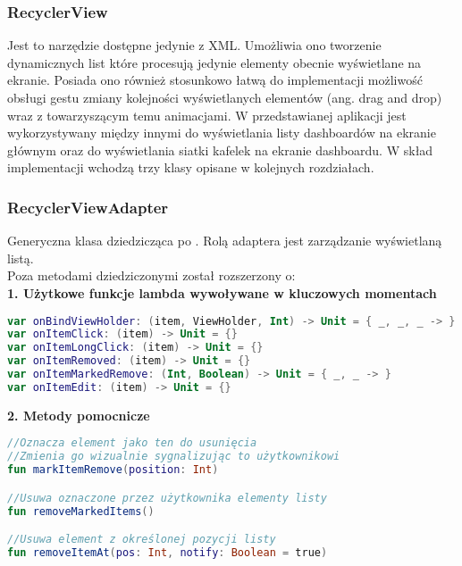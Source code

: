 \subsubsection{RecyclerView}
Jest to narzędzie dostępne jedynie z XML. Umożliwia ono tworzenie dynamicznych list które procesują jedynie elementy obecnie wyświetlane na ekranie. Posiada ono również stosunkowo łatwą do implementacji możliwość obsługi gestu zmiany kolejności wyświetlanych elementów (ang. drag and drop) wraz z towarzyszącym temu animacjami. W przedstawianej aplikacji  jest wykorzystywany między innymi do wyświetlania listy dashboardów na ekranie głównym oraz do wyświetlania siatki kafelek na ekranie dashboardu. W skład implementacji  wchodzą trzy klasy opisane w kolejnych rozdziałach.

\newpage

\subsubsection{RecyclerViewAdapter}
Generyczna klasa dziedzicząca po . Rolą adaptera jest zarządzanie wyświetlaną listą.\\

Poza metodami dziedziczonymi  został rozszerzony o:\\

\textbf{1. Użytkowe funkcje lambda wywoływane w kluczowych momentach}

\begin{lstlisting}[language=Kotlin]
var onBindViewHolder: (item, ViewHolder, Int) -> Unit = { _, _, _ -> }
var onItemClick: (item) -> Unit = {}
var onItemLongClick: (item) -> Unit = {}
var onItemRemoved: (item) -> Unit = {}
var onItemMarkedRemove: (Int, Boolean) -> Unit = { _, _ -> }
var onItemEdit: (item) -> Unit = {}
\end{lstlisting}

\vspace{1em}

\textbf{2. Metody pomocnicze}

\begin{lstlisting}[language=Kotlin]
//Oznacza element jako ten do usunięcia
//Zmienia go wizualnie sygnalizując to użytkownikowi
fun markItemRemove(position: Int)

//Usuwa oznaczone przez użytkownika elementy listy
fun removeMarkedItems()

//Usuwa element z określonej pozycji listy
fun removeItemAt(pos: Int, notify: Boolean = true)
\end{lstlisting}

